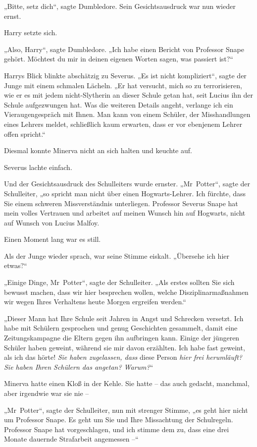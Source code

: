 „Bitte, setz dich“, sagte Dumbledore. Sein Gesichtsausdruck war nun wieder ernst. 

Harry setzte sich. 

„Also, Harry“, sagte Dumbledore. „Ich habe einen Bericht von Professor Snape gehört. Möchtest du mir in deinen eigenen Worten sagen, was passiert ist?“ 

Harrys Blick blinkte abschätzig zu Severus. „Es ist nicht kompliziert“, sagte der Junge mit einem schmalen Lächeln. „Er hat versucht, mich so zu terrorisieren, wie er es mit jedem nicht-Slytherin an dieser Schule getan hat, seit Lucius ihn der Schule aufgezwungen hat. Was die weiteren Details angeht, verlange ich ein Vieraugengespräch mit Ihnen. Man kann von einem Schüler, der Misshandlungen eines Lehrers meldet, schließlich kaum erwarten, dass er vor ebenjenem Lehrer offen spricht.“ 

Diesmal konnte Minerva nicht an sich halten und keuchte auf. 

Severus lachte einfach. 

Und der Gesichtsausdruck des Schulleiters wurde ernster. „Mr~Potter“, sagte der Schulleiter, „so spricht man nicht über einen Hogwarts-Lehrer. Ich fürchte, dass Sie einem schweren Missverständnis unterliegen. Professor Severus Snape hat mein volles Vertrauen und arbeitet auf meinen Wunsch hin auf Hogwarts, nicht auf Wunsch von Lucius Malfoy. 

Einen Moment lang war es still. 

Als der Junge wieder sprach, war seine Stimme eiskalt. „Übersehe ich hier etwas?“ 

„Einige Dinge, Mr~Potter“, sagte der Schulleiter. „Als erstes sollten Sie sich bewusst machen, dass wir hier besprechen wollen, welche Disziplinarmaßnahmen wir wegen Ihres Verhaltens heute Morgen ergreifen werden.“ 

„Dieser Mann hat Ihre Schule seit Jahren in Angst und Schrecken versetzt. Ich habe mit Schülern gesprochen und genug Geschichten gesammelt, damit eine Zeitungskampagne die Eltern gegen ihn aufbringen kann. Einige der jüngeren Schüler haben geweint, während sie mir davon erzählten. Ich habe fast geweint, als ich das hörte! \emph{Sie haben zugelassen, dass} diese Person \emph{hier frei herumläuft? Sie haben Ihren Schülern das angetan? Warum?}“ 

Minerva hatte einen Kloß in der Kehle. Sie hatte – das auch gedacht, manchmal, aber irgendwie war sie nie – 

„Mr~Potter“, sagte der Schulleiter, nun mit strenger Stimme, „es geht hier nicht um Professor Snape. Es geht um Sie und Ihre Missachtung der Schulregeln. Professor Snape hat vorgeschlagen, und ich stimme dem zu, dass eine drei Monate dauernde Strafarbeit angemessen –“ 

